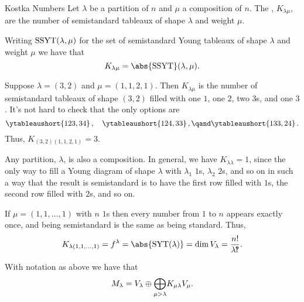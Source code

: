 \begin{dfn}{Kostka Numbers}{}
    Let \(\lambda\) be a partition of \(n\) and \(\mu\) a composition of \(n\).
    The , \(K_{\lambda\mu}\), are the number of semistandard tableaux of shape \(\lambda\) and weight \(\mu\).
\end{dfn}

Writing \(\operatorname{SSYT}(\lambda, \mu)\) for the set of semistandard Young tableaux of shape \(\lambda\) and weight \(\mu\) we have that
\begin{equation}
    K_{\lambda\mu} = \abs{\semistandardYoungTableaux}(\lambda, \mu).
\end{equation}

\begin{exm}{}{}
    Suppose \(\lambda = (3, 2)\) and \(\mu = (1, 1, 2, 1)\).
    Then \(K_{\lambda\mu}\) is the number of semistandard tableaux of shape \((3, 2)\) filled with one \(1\), one \(2\), two \(3\)s, and one \(3\).
    It's not hard to check that the only options are
    \begin{equation}
        \ytableaushort{123,34}\,,\quad \ytableaushort{124,33}\,,\qand \ytableaushort{133,24}\,.
    \end{equation}
    Thus, \(K_{(3,2)(1,1,2,1)} = 3\).
    
    Any partition, \(\lambda\), is also a composition.
    In general, we have \(K_{\lambda\lambda} = 1\), since the only way to fill a Young diagram of shape \(\lambda\) with \(\lambda_1\) \(1\)s, \(\lambda_2\) \(2\)s, and so on in such a way that the result is semistandard is to have the first row filled with \(1\)s, the second row filled with \(2\)s, and so on.
    
    If \(\mu = (1, 1, \dotsc, 1)\) with \(n\) \(1\)s then every number from \(1\) to \(n\) appears exactly once, and being semistandard is the same as being standard.
    Thus,
    \begin{equation}
        K_{\lambda(1, 1, \dotsc, 1)} = f^\lambda = \abs{\standardYoungTableaux(\lambda)} = \dim V_\lambda = \frac{n!}{\lambda \intterobang}.
    \end{equation}
\end{exm}

\begin{prp}{}{}
    With notation as above we have that
    \begin{equation}
        M_\lambda = V_\lambda \oplus \vphantom{\bigoplus}\smash{\bigoplus_{\mu > \lambda}} K_{\mu\lambda} V_\mu.
    \end{equation}
\end{prp}

